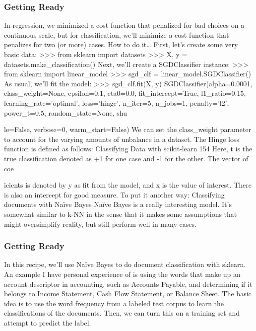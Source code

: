 \subsubsection*{Getting Ready}
In regression, we minimized a cost function that penalized for bad choices on a continuous
scale, but for classification, we'll minimize a cost function that penalizes for two (or more) cases.
How to do it…
First, let's create some very basic data:
>>> from sklearn import datasets
>>> X, y = datasets.make_classification()
Next, we'll create a SGDClassifier instance:
>>> from sklearn import linear_model
>>> sgd_clf = linear_model.SGDClassifier()
As usual, we'll fit the model:
>>> sgd_clf.fit(X, y)
SGDClassifier(alpha=0.0001, class_weight=None, epsilon=0.1, eta0=0.0,
fit_intercept=True, l1_ratio=0.15,
learning_rate='optimal', loss='hinge', n_iter=5,
n_jobs=1, penalty='l2', power_t=0.5, random_state=None,
shu\item le=False, verbose=0, warm_start=False)
We can set the class_weight parameter to account for the varying amounts of unbalance
in a dataset.
The Hinge loss function is defined as follows:
Classifying Data with scikit-learn
154
Here, t is the true classification denoted as +1 for one case and -1 for the other. The vector of
coe\item icients is denoted by y as fit from the model, and x is the value of interest. There is also
an intercept for good measure. To put it another way:
Classifying documents with Naïve Bayes
Naïve Bayes is a really interesting model. It's somewhat similar to k-NN in the sense that it
makes some assumptions that might oversimplify reality, but still perform well in many cases.
\subsubsection*{Getting Ready}
In this recipe, we'll use Naïve Bayes to do document classification with sklearn. An example
I have personal experience of is using the words that make up an account descriptor in
accounting, such as Accounts Payable, and determining if it belongs to Income Statement,
Cash Flow Statement, or Balance Sheet.
The basic idea is to use the word frequency from a labeled test corpus to learn the
classifications of the documents. Then, we can turn this on a training set and attempt to
predict the label.

